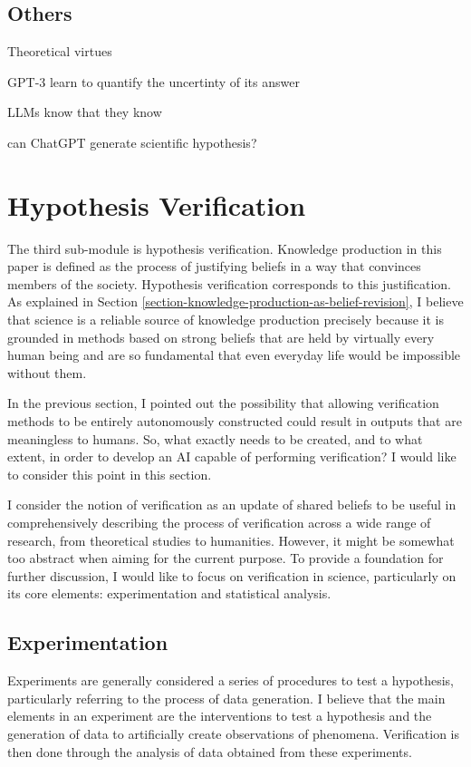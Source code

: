 
\subsection{Others}
Theoretical virtues \cite{schindler2022theoretical}

GPT-3 learn to quantify the uncertinty of its answer \cite{lin2022teaching}

LLMs know that they know \cite{kadavath2022language}
 
can ChatGPT generate scientific hypothesis? \cite{park2023can}

\section{Hypothesis Verification}
The third sub-module is hypothesis verification. Knowledge production in this paper is defined as the process of justifying beliefs in a way that convinces members of the society. Hypothesis verification corresponds to this justification. As explained in Section \ref{section-knowledge-production-as-belief-revision}, I believe that science is a reliable source of knowledge production precisely because it is grounded in methods based on strong beliefs that are held by virtually every human being and are so fundamental that even everyday life would be impossible without them.

In the previous section, I pointed out the possibility that allowing verification methods to be entirely autonomously constructed could result in outputs that are meaningless to humans. So, what exactly needs to be created, and to what extent, in order to develop an AI capable of performing verification? I would like to consider this point in this section.

I consider the notion of verification as an update of shared beliefs to be useful in comprehensively describing the process of verification across a wide range of research, from theoretical studies to humanities. However, it might be somewhat too abstract when aiming for the current purpose. To provide a foundation for further discussion, I would like to focus on verification in science, particularly on its core elements: experimentation and statistical analysis.

\subsection{Experimentation}
Experiments are generally considered a series of procedures to test a hypothesis, particularly referring to the process of data generation. I believe that the main elements in an experiment are the interventions to test a hypothesis and the generation of data to artificially create observations of phenomena. Verification is then done through the analysis of data obtained from these experiments.

